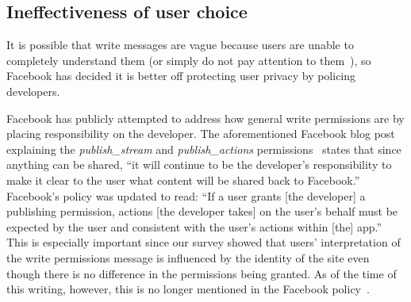 \documentclass{sig-alternate}
\begin{document}
\subsection{Ineffectiveness of user choice}

It is possible that write messages are vague because users are unable to completely understand them (or simply do not pay attention to them~\cite{egelman}), so Facebook has decided it is better off protecting user privacy by policing developers.

Facebook has publicly attempted to address how general write permissions are by placing responsibility on the developer. The aforementioned Facebook blog post explaining the \emph{publish\_stream} and \emph{publish\_actions} permissions~\cite{publishperms} states that since anything can be shared, ``it will continue to be the developer's responsibility to make it clear to the user what content will be shared back to Facebook.'' Facebook's policy was updated to read: ``If a user grants [the developer] a publishing permission, actions [the developer takes] on the user's behalf must be expected by the user and consistent with the user's actions within [the] app.'' This is especially important since our survey showed that users' interpretation of the write permissions message is influenced by the identity of the site even though there is no difference in the permissions being granted. As of the time of this writing, however, this is no longer mentioned in the Facebook policy~\cite{fbpolicy}. 




\end{document}
